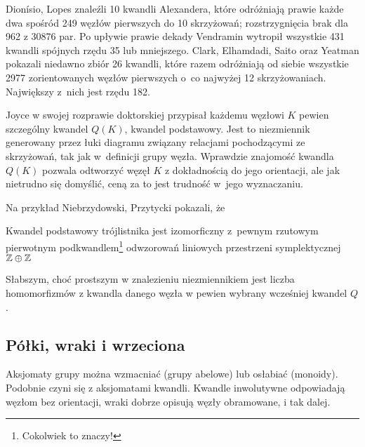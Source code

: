 Dionísio, Lopes \cite{lopes03} znaleźli 10 kwandli Alexandera, które odróżniają prawie każde dwa spośród 249 węzłów pierwszych do 10 skrzyżowań; rozstrzygnięcia brak dla 962 z 30876 par.
%
%
Po upływie prawie dekady Vendramin \cite{vendramin12} wytropił wszystkie 431 kwandli spójnych rzędu 35 lub mniejszego.
%
Clark, Elhamdadi, Saito oraz Yeatman \cite{clark13} pokazali niedawno zbiór 26 kwandli, które razem odróżniają od siebie wszystkie 2977 zorientowanych węzłów pierwszych o~co najwyżej 12 skrzyżowaniach.
%
%
%
%
Największy z~nich jest rzędu 182.

Joyce w swojej rozprawie doktorskiej przypisał każdemu węzłowi $K$ pewien szczególny kwandel $Q(K)$, kwandel podstawowy.
%
%
Jest to niezmiennik generowany przez łuki diagramu związany relacjami pochodzącymi ze skrzyżowań, tak jak w~definicji grupy węzła.
Wprawdzie znajomość kwandla $Q(K)$ pozwala odtworzyć węzęł $K$ z dokładnością do jego orientacji, ale jak nietrudno się domyślić, ceną za to jest trudność w~jego wyznaczaniu.

Na przykład Niebrzydowski, Przytycki \cite{niebrzydowski09} pokazali, że
%
%

\begin{example}
    Kwandel podstawowy trójlistnika  jest izomorficzny z~pewnym rzutowym pierwotnym podkwandlem\footnote{Cokolwiek to znaczy!} odwzorowań liniowych przestrzeni symplektycznej $\mathbb Z \oplus \mathbb Z$
\end{example}

Słabszym, choć prostszym w znalezieniu niezmiennikiem jest liczba homomorfizmów z kwandla danego węzła w pewien wybrany wcześniej kwandel $Q$.

\subsection{Półki, wraki i wrzeciona}
Aksjomaty grupy można wzmacniać (grupy abelowe) lub osłabiać (monoidy).
Podobnie czyni się z aksjomatami kwandli.
Kwandle inwolutywne odpowiadają węzłom bez orientacji, wraki dobrze opisują węzły obramowane, i tak dalej.
%
%

